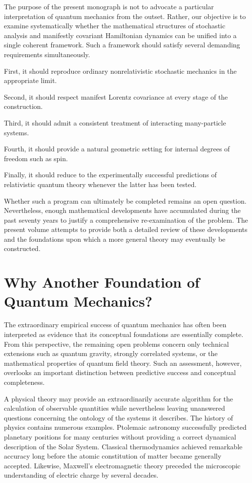 The purpose of the present monograph is not to advocate a particular
interpretation of quantum mechanics from the outset. Rather, our objective is
to examine systematically whether the mathematical structures of stochastic
analysis and manifestly covariant Hamiltonian dynamics can be unified into a
single coherent framework. Such a framework should satisfy several demanding
requirements simultaneously.

First, it should reproduce ordinary nonrelativistic stochastic mechanics in
the appropriate limit.

Second, it should respect manifest Lorentz covariance at every stage of the
construction.

Third, it should admit a consistent treatment of interacting many-particle
systems.

Fourth, it should provide a natural geometric setting for internal degrees of
freedom such as spin.

Finally, it should reduce to the experimentally successful predictions of
relativistic quantum theory whenever the latter has been tested.

Whether such a program can ultimately be completed remains an open question.
Nevertheless, enough mathematical developments have accumulated during the
past seventy years to justify a comprehensive re-examination of the problem.
The present volume attempts to provide both a detailed review of these
developments and the foundations upon which a more general theory may
eventually be constructed.
\section{Why Another Foundation of Quantum Mechanics?}

The extraordinary empirical success of quantum mechanics has often been
interpreted as evidence that its conceptual foundations are essentially
complete. From this perspective, the remaining open problems concern only
technical extensions such as quantum gravity, strongly correlated systems, or
the mathematical properties of quantum field theory. Such an assessment,
however, overlooks an important distinction between predictive success and
conceptual completeness.

A physical theory may provide an extraordinarily accurate algorithm for the
calculation of observable quantities while nevertheless leaving unanswered
questions concerning the ontology of the systems it describes. The history of
physics contains numerous examples. Ptolemaic astronomy successfully predicted
planetary positions for many centuries without providing a correct dynamical
description of the Solar System. Classical thermodynamics achieved remarkable
accuracy long before the atomic constitution of matter became generally
accepted. Likewise, Maxwell's electromagnetic theory preceded the microscopic
understanding of electric charge by several decades.

